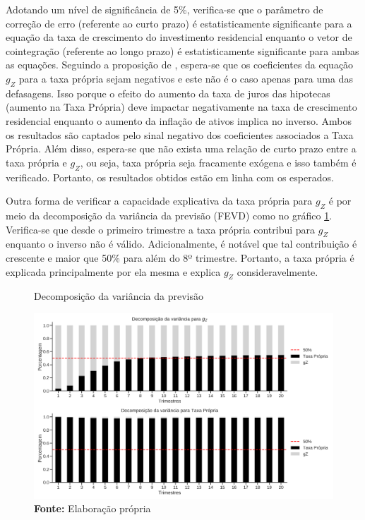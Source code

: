 Adotando um nível de significância de 5\%, verifica-se que o parâmetro de correção de erro (referente ao curto prazo) é estatisticamente significante para a equação da taxa de crescimento do investimento residencial enquanto o vetor de cointegração (referente ao longo prazo) é estatisticamente significante para ambas as equações. Seguindo a proposição de \textcite{teixeira_crescimento_2015}, espera-se que os coeficientes da equação $g_Z$ para a taxa própria sejam negativos e este não é o caso apenas para uma das defasagens. Isso porque o efeito do aumento da taxa de juros das hipotecas (aumento na Taxa Própria) deve impactar negativamente na taxa de crescimento residencial enquanto o aumento da inflação de ativos implica no inverso. Ambos os resultados são captados pelo sinal negativo dos coeficientes associados a Taxa Própria.
Além disso, espera-se que não exista uma relação de curto prazo entre a taxa própria e $g_Z$, ou seja, taxa própria seja fracamente exógena e isso também é verificado. Portanto, os resultados obtidos estão em linha com os esperados. 

Outra forma de verificar a capacidade explicativa da taxa própria para $g_Z$ é por meio da decomposição da variância da previsão (FEVD) como no gráfico \ref{fevd}. Verifica-se que desde o primeiro trimestre a taxa própria contribui para $g_Z$ enquanto o inverso não é válido. Adicionalmente, é notável que tal contribuição é crescente e maior que 50\% para além do 8º trimestre. Portanto, a taxa própria é explicada principalmente por ela mesma e explica $g_Z$ consideravelmente.

\begin{figure}[H]
	\centering
	\caption{Decomposição da variância da previsão}
	\label{fevd}
	\includegraphics[width=\textwidth]{Fatos_Estilizados/Figs/FEVD_VECM.png}
	\caption*{\textbf{Fonte:} Elaboração própria}
\end{figure}

